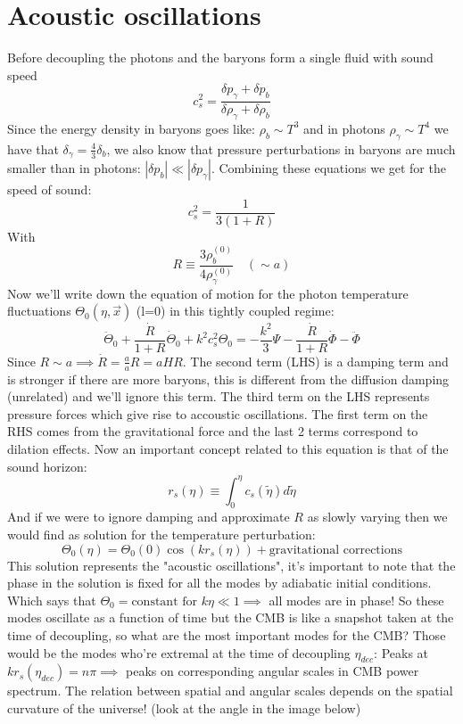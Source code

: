 \documentclass{article}
\begin{document}
\section{Acoustic oscillations}
Before decoupling the photons and the baryons form a single fluid with sound speed
\begin{equation}
  c_s^2 = \frac{\delta p_\gamma + \delta p_b}{\delta \rho_\gamma + \delta \rho_b}
\end{equation}
Since the energy density in baryons goes like: $\rho_b \sim T^3$ and in photons $\rho_\gamma \sim T^4$ we have that $\delta_\gamma = \frac{4}{3}\delta_b$, we also know that pressure perturbations in baryons are much smaller than in photons: $|\delta p_b| \ll |\delta p_\gamma|$. Combining these equations we get for the speed of sound:
\begin{equation}
  c_s^2 = \frac{1}{3(1+R)}
\end{equation}
With
\begin{equation}
  R \equiv \frac{3\rho_b^{(0)}}{4\rho_\gamma^{(0)}} \quad (\sim a)
\end{equation}
Now we'll write down the equation of motion for the photon temperature fluctuations $\Theta_0(\eta,\vec{x})$ (l=0)  in this tightly coupled regime:
\begin{equation}
  \ddot{\Theta}_0 + \frac{\dot{R}}{1+R}\dot{\Theta}_0 + k^2c_s^2 \Theta_0 = -\frac{k^2}{3}\Psi - \frac{\dot{R}}{1+R}\dot{\Phi} - \ddot{\Phi} \label{oscillations}
\end{equation}
Since $R\sim a \implies \dot{R} = \frac{a}{a}R = aHR$. The second term (LHS) is a damping term and is stronger if there are more baryons, this is different from the diffusion damping (unrelated) and we'll ignore this term. The third term on the LHS represents pressure forces which give rise to accoustic oscillations. The first term on the RHS comes from the gravitational force and the last 2 terms correspond to dilation effects. Now an important concept related to this equation is that of the sound horizon:
\begin{equation}
  r_s(\eta) \equiv \int_0^\eta c_s(\tilde{\eta})d\tilde{\eta}
\end{equation}
And if we were to ignore damping and approximate $R$ as slowly varying then we would find as solution for the temperature perturbation:
\begin{equation}
  \Theta_0(\eta) = \Theta_0(0)\cos(kr_s(\eta)) + \text{gravitational corrections}
\end{equation}
This solution represents the "acoustic oscillations", it's important to note that the phase in the solution is fixed for all the modes by adiabatic initial conditions. Which says that $\Theta_0=\text{constant for }k\eta \ll 1 \implies$ all modes are in phase! So these modes oscillate as a function of time but the CMB is like a snapshot taken at the time of decoupling, so what are the most important modes for the CMB? Those would be the modes who're extremal at the time of decoupling $\eta_{dec}$: Peaks at $kr_s(\eta_{dec}) = n\pi \implies$ peaks on corresponding angular scales in CMB power spectrum. The relation between spatial and angular scales depends on the spatial curvature of the universe! (look at the angle in the image below)
\end{document}
